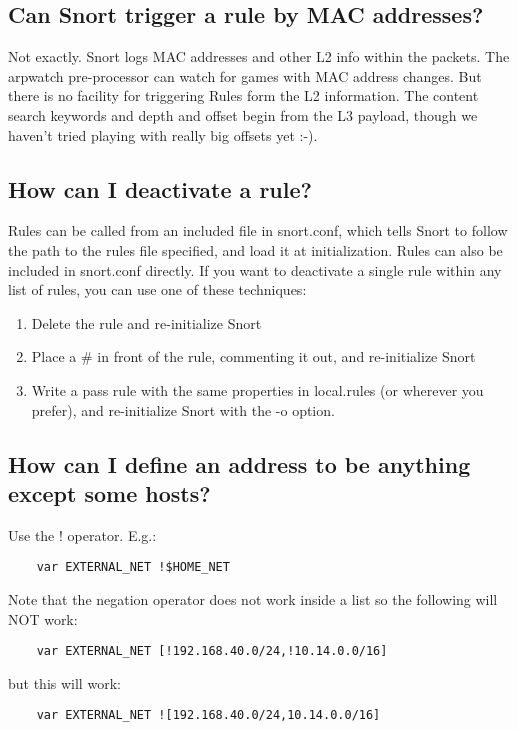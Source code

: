 \documentclass{article}
\begin{document}
\subsection{Can Snort trigger a rule by MAC addresses?}

Not exactly. Snort logs MAC addresses and other L2 info within the packets. The
arpwatch pre-processor can watch for games with MAC address changes. But there
is no facility for triggering Rules form the L2 information. The content search
keywords and depth and offset begin from the L3 payload, though we haven't
tried playing with really big offsets yet :-).

\subsection{How can I deactivate a rule?}

Rules can be called from an included file in snort.conf, which tells Snort to
follow the path to the rules file specified, and load it at initialization.
Rules can also be included in snort.conf directly. If you want to deactivate a
single rule within any list of rules, you can use one of these techniques:

\begin{enumerate}
\item  Delete the rule and re-initialize Snort
\item  Place a \# in front of the rule, commenting it out, and re-initialize Snort
\item  Write a pass rule with the same properties in local.rules (or wherever you
    prefer), and re-initialize Snort with the -o option.
\end{enumerate}

\subsection{How can I define an address to be anything except some hosts?}

Use the ! operator. E.g.:

\begin{verbatim}
    var EXTERNAL_NET !$HOME_NET
\end{verbatim}
Note that the negation operator does not work inside a list so the following
will NOT work:
\begin{verbatim}
    var EXTERNAL_NET [!192.168.40.0/24,!10.14.0.0/16]
\end{verbatim}
but this will work:
\begin{verbatim}
    var EXTERNAL_NET ![192.168.40.0/24,10.14.0.0/16]
\end{verbatim}
\end{document}
